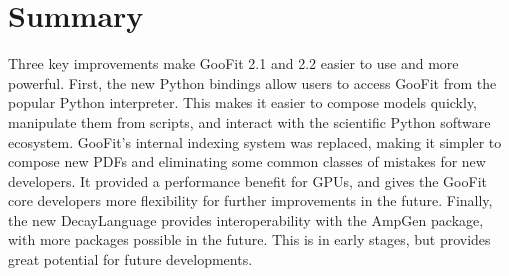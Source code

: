 \documentclass{webofc}
\begin{document}
\section{Summary}
\label{sec-summary}

Three key improvements make GooFit 2.1 and 2.2 easier to use and more powerful. First, the new Python bindings allow users to access GooFit from the popular Python interpreter. This makes it easier to compose models quickly, manipulate them from scripts, and interact with the scientific Python software ecosystem.
GooFit's internal indexing system was replaced, making it simpler to compose new PDFs and eliminating some common classes of mistakes for new developers. It provided a performance benefit for GPUs, and gives the GooFit core developers more flexibility for further improvements in the future.
Finally, the new DecayLanguage provides interoperability with the AmpGen package, with more packages possible in the future. This is in early stages, but provides great potential for future developments.


%
\end{document}

